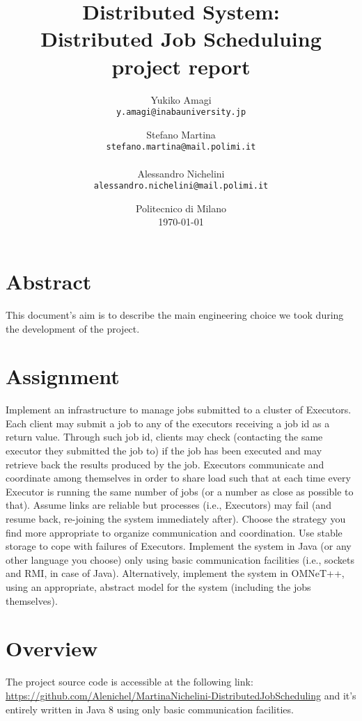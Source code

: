 \documentclass{article}
\title{Distributed System:\\ Distributed Job Scheduluing project report} %
\author{Yukiko Amagi\\ \texttt{y.amagi@inabauniversity.jp}} %
\author{Stefano Martina\\ \texttt{stefano.martina@mail.polimi.it}
		\\\\Alessandro Nichelini\\ \texttt{alessandro.nichelini@mail.polimi.it} }
\date{Politecnico di Milano\\\today} %
\begin{document}
\maketitle %


\section*{Abstract} %

This document's aim is to describe the main engineering choice we took during the development of the project.

\section*{Assignment}
Implement an infrastructure to manage jobs submitted to a cluster of Executors. Each client may submit a job to any of the executors receiving a job id as a return value. Through such job id, clients may check (contacting the same  executor  they  submitted  the  job  to)  if  the  job  has  been  executed  and  may  retrieve  back  the  results produced by the job.
Executors  communicate  and  coordinate  among  themselves  in  order  to  share  load  such  that  at  each  time  every Executor  is  running  the  same  number  of  jobs  (or  a  number  as  close  as  possible  to  that).  Assume  links  are reliable but processes (i.e., Executors) may fail (and resume back, re-joining the system immediately after). Choose the strategy you find more appropriate to organize communication and coordination. Use stable storage to cope with failures of Executors.
Implement  the  system  in  Java  (or  any  other  language  you  choose)  only  using  basic  communication  facilities (i.e.,  sockets  and  RMI,  in  case  of  Java).  Alternatively,  implement  the  system  in  OMNeT++,  using  an appropriate, abstract model for the system (including the jobs themselves).

\section*{Overview}
\begin{info}
	The project source code is accessible at the following link: \href{https://github.com/Alenichel/MartinaNichelini-DistributedJobScheduling}{https://github.com/Alenichel/MartinaNichelini-DistributedJobScheduling} and it's entirely written in Java 8 using only basic communication facilities.

\end{info}
\end{document}
